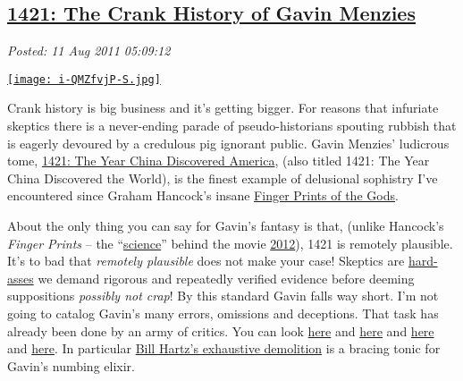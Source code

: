 %


\subsection*{\href{https://bakerjd99.wordpress.com/2011/08/11/1421-the-crank-history-of-gavin-menzies/}{1421: The Crank History of Gavin Menzies}}


\noindent\emph{Posted: 11 Aug 2011 05:09:12}
\vspace{6pt}

\captionsetup[floatingfigure]{labelformat=empty}
\begin{floatingfigure}[r]{0.25\textwidth}
\centering
\href{http://www.goodreads.com/book/show/4813.1421}{\texttt{[image: i-QMZfvjP-S.jpg]}}
\label{fig:1742X0}
\end{floatingfigure}Crank
history is big business and it's getting bigger. For reasons that
infuriate skeptics there is a never-ending parade of pseudo-historians
spouting rubbish that is eagerly devoured by a credulous pig ignorant
public. Gavin Menzies' ludicrous tome,
\href{http://www.1421exposed.com/html/1421\_and\_all\_that\_junk.html}{1421:
The Year China Discovered America}, (also titled 1421: The Year China
Discovered the World), is the finest example of delusional sophistry
I've encountered since Graham Hancock's insane
\href{http://www.csicop.org/si/show/tracing\_graham\_hancockrsquos\_shifting\_cataclysm/}{Finger
Prints of the Gods}.

About the only thing you can say for Gavin's fantasy is that, (unlike
Hancock's \emph{Finger Prints} -- the
``\href{http://en.wikipedia.org/wiki/Fingerprints\_of\_the\_Gods}{science}''
behind the movie
\href{http://blog.moviefone.com/2011/01/03/nasa-names-most-realistic-and-unrealistic-sci-fi-films-of-all-ti/}{2012}),
1421 is remotely plausible. It's to bad that \emph{remotely plausible}
does not make your case! Skeptics are
\href{http://bakerjd99.wordpress.com/2009/10/29/hard-ass-skeptic-rules/}{hard-asses}
we demand rigorous and repeatedly verified evidence before deeming
suppositions \emph{possibly not crap}! By this standard Gavin falls way
short. I'm not going to catalog Gavin's many errors, omissions and
deceptions. That task has already been done by an army of critics. You
can look
\href{http://www.csicop.org/sb/show/zheng\_he\_in\_the\_americas\_and\_other\_unlikely\_tales\_of\_exploration\_and\_discov/}{here}
and
\href{https://docs.google.com/viewer?url=http://www.e-perimetron.org/Vol\_2\_4/Wade.pdf\&pli=1}{here}
and \href{http://www.asianreviewofbooks.com/new/?revID=201}{here} and
\href{http://badarchaeology.wordpress.com/tag/gavin-menzies/}{here}. In
particular \href{http://www.dightonrock.com/gavinsfantalyland.htm}{Bill
Hartz's exhaustive demolition} is a bracing tonic for Gavin's numbing
elixir.


